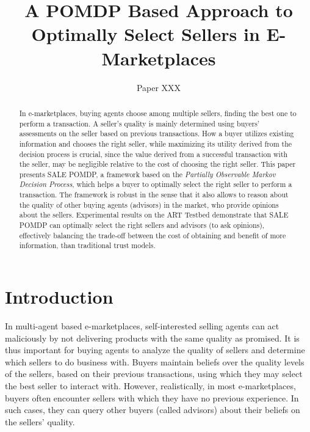 \documentclass{aamas2014}
\providecommand{\SALEP}{SALE POMDP}
\begin{document}
\title{A POMDP Based Approach to Optimally Select Sellers in E-Marketplaces}

\author{Paper XXX}

\maketitle

\begin{abstract}
In e-marketplaces, buying agents choose among multiple sellers, finding the best one to perform a transaction. A seller's quality is mainly determined using buyers' assessments on the seller based on previous transactions. How a buyer utilizes existing information and chooses the right seller, while maximizing its utility derived from the decision process is crucial, since the value derived from a successful transaction with the seller, may be negligible relative to the cost of choosing the right seller. This paper presents \SALEP{}, a framework based on the \textit{Partially Observable Markov Decision Process}, which helps a buyer to optimally select the right seller to perform a transaction. The framework is robust in the sense that it also allows to reason about the quality of other buying agents (advisors) in the market, who provide opinions about the sellers. Experimental results on the ART Testbed demonstrate that \SALEP{} can optimally select the right sellers and advisors (to ask opinions), effectively balancing the trade-off between the cost of obtaining and benefit of more information, than traditional trust models.
\end{abstract}




\section{Introduction}\label{introduction}

In multi-agent based e-marketplaces, self-interested selling agents can act maliciously by not delivering products with the same quality as promised. It is thus important for buying agents to analyze the quality of sellers and determine which sellers to do business with. Buyers maintain beliefs over the quality levels of the sellers, based on their previous transactions, using which they may select the best seller to interact with. However, realistically, in most e-marketplaces, buyers often encounter sellers with which they have no previous experience. In such cases, they can query other buyers (called advisors) about their beliefs on the sellers' quality.
\end{document}
